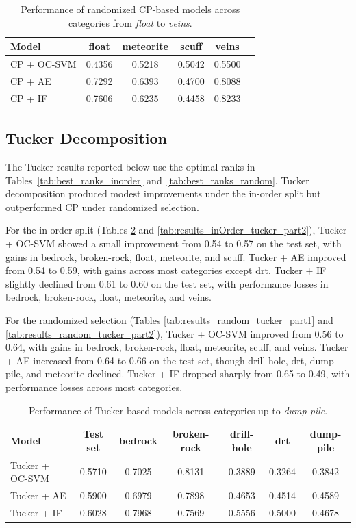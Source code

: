 \documentclass[pdflatex,sn-mathphys-ay]{sn-jnl}
\begin{document}
\begin{table}
\centering
\begin{tabular}{lccccc}
\hline
\textbf{Model} & \textbf{float} & \textbf{meteorite} & \textbf{scuff} & \textbf{veins} \\
\hline
CP + OC-SVM & 0.4356 & 0.5218 & 0.5042 & 0.5500 \\
CP + AE     & 0.7292 & 0.6393 & 0.4700 & 0.8088 \\
CP + IF     & 0.7606 & 0.6235 & 0.4458 & 0.8233 \\
\hline
\end{tabular}
\caption{Performance of randomized CP-based models across categories from \textit{float} to \textit{veins}.}
\label{tab:random_cp_results_part2}
\end{table}

\subsection{Tucker Decomposition}
The Tucker results reported below use the optimal ranks in Tables~\ref{tab:best_ranks_inorder} and~\ref{tab:best_ranks_random}. Tucker decomposition produced modest improvements under the in-order split but outperformed CP under randomized selection.  

For the in-order split (Tables \ref{tab:results_inOrder_tucker_part1} and \ref{tab:results_inOrder_tucker_part2}), Tucker + OC-SVM showed a small improvement from 0.54 to 0.57 on the test set, with gains in bedrock, broken-rock, float, meteorite, and scuff. Tucker + AE improved from 0.54 to 0.59, with gains across most categories except drt. Tucker + IF slightly declined from 0.61 to 0.60 on the test set, with performance losses in bedrock, broken-rock, float, meteorite, and veins.  

For the randomized selection (Tables \ref{tab:results_random_tucker_part1} and \ref{tab:results_random_tucker_part2}), Tucker + OC-SVM improved from 0.56 to 0.64, with gains in bedrock, broken-rock, float, meteorite, scuff, and veins. Tucker + AE increased from 0.64 to 0.66 on the test set, though drill-hole, drt, dump-pile, and meteorite declined. Tucker + IF dropped sharply from 0.65 to 0.49, with performance losses across most categories.  

\begin{table}
\centering
\begin{tabular}{lcccccc}
\hline
\textbf{Model} & \textbf{Test set} & \textbf{bedrock} & \textbf{broken-rock} & \textbf{drill-hole} & \textbf{drt} & \textbf{dump-pile} \\
\hline
Tucker + OC-SVM & 0.5710 & 0.7025 & 0.8131 & 0.3889 & 0.3264 & 0.3842 \\
Tucker + AE     & 0.5900 & 0.6979 & 0.7898 & 0.4653 & 0.4514 & 0.4589 \\
Tucker + IF     & 0.6028 & 0.7968 & 0.7569 & 0.5556 & 0.5000 & 0.4678 \\
\hline
\end{tabular}
\caption{Performance of Tucker-based models across categories up to \textit{dump-pile}.}
\label{tab:results_inOrder_tucker_part1}
\end{table}
\end{document}
